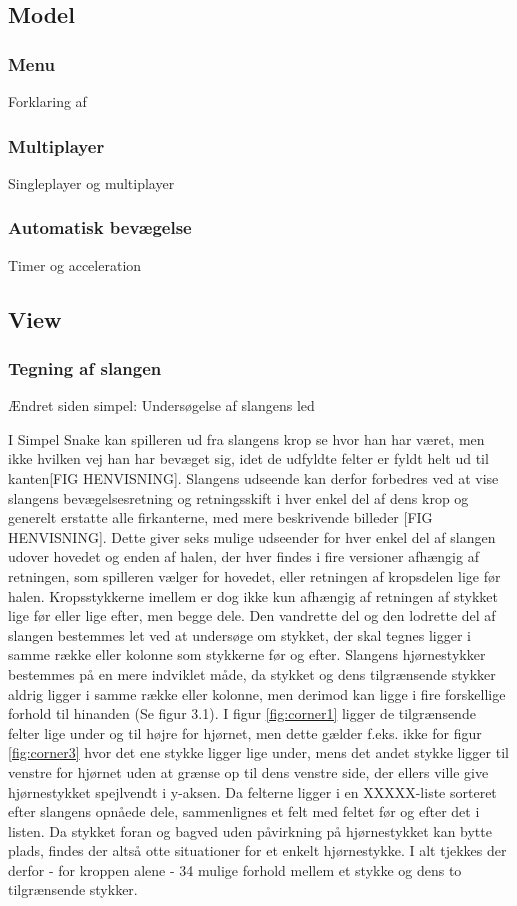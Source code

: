 \subsection{Model}
\subsubsection{Menu}
Forklaring af

\subsubsection{Multiplayer}
Singleplayer og multiplayer

\subsubsection{Automatisk bevægelse}
Timer og acceleration


\subsection{View}
\subsubsection{Tegning af slangen}
Ændret siden simpel: Undersøgelse af slangens led

I Simpel Snake kan spilleren ud fra slangens krop se hvor han har været, men ikke hvilken vej han har bevæget sig, idet de udfyldte felter er fyldt helt ud til kanten[FIG HENVISNING]. Slangens udseende kan derfor forbedres ved at vise slangens bevægelsesretning og retningsskift i hver enkel del af dens krop og generelt erstatte alle firkanterne, med mere beskrivende billeder [FIG HENVISNING]. Dette giver seks mulige udseender for hver enkel del af slangen udover hovedet og enden af halen, der hver findes i fire versioner afhængig af retningen, som spilleren vælger for hovedet, eller retningen af kropsdelen lige før halen. Kropsstykkerne imellem er dog ikke kun afhængig af retningen af stykket lige før eller lige efter, men begge dele. Den vandrette del og den lodrette del af slangen bestemmes let ved at undersøge om stykket, der skal tegnes ligger i samme række eller kolonne som stykkerne før og efter. Slangens hjørnestykker bestemmes på en mere indviklet måde, da stykket og dens tilgrænsende stykker aldrig ligger i samme række eller kolonne, men derimod kan ligge i fire forskellige forhold til hinanden (Se figur 3.1). I figur \ref{fig:corner1} ligger de tilgrænsende felter lige under og til højre for hjørnet, men dette gælder f.eks. ikke for figur \ref{fig:corner3} hvor det ene stykke ligger lige under, mens det andet stykke ligger til venstre for hjørnet uden at grænse op til dens venstre side, der ellers ville give hjørnestykket spejlvendt i y-aksen. Da felterne ligger i en XXXXX-liste sorteret efter slangens opnåede dele, sammenlignes et felt med feltet før og efter det i listen. Da stykket foran og bagved uden påvirkning på hjørnestykket kan bytte plads, findes der altså otte situationer for et enkelt hjørnestykke. I alt tjekkes der derfor - for kroppen alene - 34 mulige forhold mellem et stykke og dens to tilgrænsende stykker.
\linebreak

